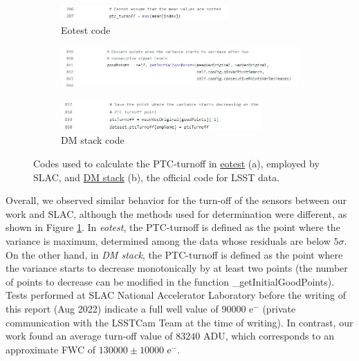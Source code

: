\begin{figure}[!htb]
     \begin{subfigure}[b]{\textwidth}
         
         \includegraphics[width=0.7\textwidth,left]{Figures/eotest_turnoff.jpg}
         \caption{Eotest code}
     \end{subfigure}
     \vspace{3mm}
     \begin{subfigure}[b]{\textwidth}
         
         \includegraphics[width=\textwidth,left]{Figures/DMstack_turnoff1.jpg}
     \end{subfigure}    
     \vspace{3mm}
     \begin{subfigure}[b]{\textwidth}
         
         \includegraphics[width=0.85\textwidth,left]{Figures/DMstack_turnoff2.jpg}
         \caption{DM stack code}
     \end{subfigure}
        \caption{Codes used to calculate the PTC-turnoff in \href{https://github.com/lsst-camera-dh/eotest/blob/32c17b0a33b9c099651ed581ee90c1b1101012fb/python/lsst/eotest/sensor/ptcTask.py}{eotest} (a), employed by SLAC, and \href{https://github.com/lsst/cp_pipe/blob/6bae47012f2f119b186509ce7efd963b68b61f0d/python/lsst/cp/pipe/ptc/cpSolvePtcTask.py}{DM stack} (b), the official code for LSST data.}
        \label{fig:Turnoff_codes}
\end{figure}
Overall, we observed similar behavior for the turn-off of the sensors between our work and SLAC, although the methods used for determination were different, as shown in Figure \ref{fig:Turnoff_codes}. In \textit{eotest}, the PTC-turnoff is defined as the point where the variance is maximum, determined among the data whose residuals are below $5\sigma$. On the other hand, in \textit{DM stack}, the PTC-turnoff is defined as the point where the variance starts to decrease monotonically by at least two points (the number of points to decrease can be modified in the function \_getInitialGoodPoints). Tests performed at SLAC National Accelerator Laboratory before the writing of this report (Aug 2022) indicate a full well value of 90000 e$^-$ (private communication with the LSSTCam Team at the time of writing). In contrast, our work found an average turn-off value of $83240$ ADU, which corresponds to an approximate FWC of $130000 \pm 10000$ e$^-$.

